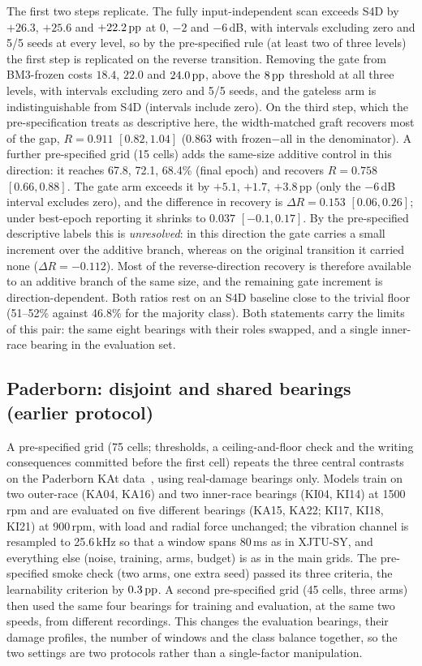 The first two steps replicate. The fully input-independent scan exceeds S4D by $+26.3$, $+25.6$ and $+22.2\,\mathrm{pp}$ at $0$, $-2$ and $-6$\,dB, with intervals excluding zero and 5/5 seeds at every level, so by the pre-specified rule (at least two of three levels) the first step is replicated on the reverse transition. Removing the gate from BM3-frozen costs $18.4$, $22.0$ and $24.0\,\mathrm{pp}$, above the $8\,\mathrm{pp}$ threshold at all three levels, with intervals excluding zero and 5/5 seeds, and the gateless arm is indistinguishable from S4D (intervals include zero). On the third step, which the pre-specification treats as descriptive here, the width-matched graft recovers most of the gap, $R = 0.911$ $[0.82, 1.04]$ ($0.863$ with frozen$-$all in the denominator). A further pre-specified grid (15 cells) adds the same-size additive control in this direction: it reaches 67.8, 72.1, 68.4\% (final epoch) and recovers $R = 0.758$ $[0.66, 0.88]$. The gate arm exceeds it by $+5.1$, $+1.7$, $+3.8$\,pp (only the $-6$\,dB interval excludes zero), and the difference in recovery is $\Delta R = 0.153$ $[0.06, 0.26]$; under best-epoch reporting it shrinks to $0.037$ $[-0.1, 0.17]$. By the pre-specified descriptive labels this is \emph{unresolved}: in this direction the gate carries a small increment over the additive branch, whereas on the original transition it carried none ($\Delta R = -0.112$). Most of the reverse-direction recovery is therefore available to an additive branch of the same size, and the remaining gate increment is direction-dependent. Both ratios rest on an S4D baseline close to the trivial floor (51--52\% against 46.8\% for the majority class). Both statements carry the limits of this pair: the same eight bearings with their roles swapped, and a single inner-race bearing in the evaluation set.

\subsection{Paderborn: disjoint and shared bearings (earlier protocol)}
\label{sec:results:pu}

A pre-specified grid (75 cells; thresholds, a ceiling-and-floor check and the writing consequences committed before the first cell) repeats the three central contrasts on the Paderborn KAt data~\cite{lessmeier2016kat}, using real-damage bearings only. Models train on two outer-race (KA04, KA16) and two inner-race bearings (KI04, KI14) at 1500\,rpm and are evaluated on five different bearings (KA15, KA22; KI17, KI18, KI21) at 900\,rpm, with load and radial force unchanged; the vibration channel is resampled to 25.6\,kHz so that a window spans 80\,ms as in XJTU-SY, and everything else (noise, training, arms, budget) is as in the main grids. The pre-specified smoke check (two arms, one extra seed) passed its three criteria, the learnability criterion by $0.3\,\mathrm{pp}$. A second pre-specified grid (45 cells, three arms) then used the same four bearings for training and evaluation, at the same two speeds, from different recordings. This changes the evaluation bearings, their damage profiles, the number of windows and the class balance together, so the two settings are two protocols rather than a single-factor manipulation.

